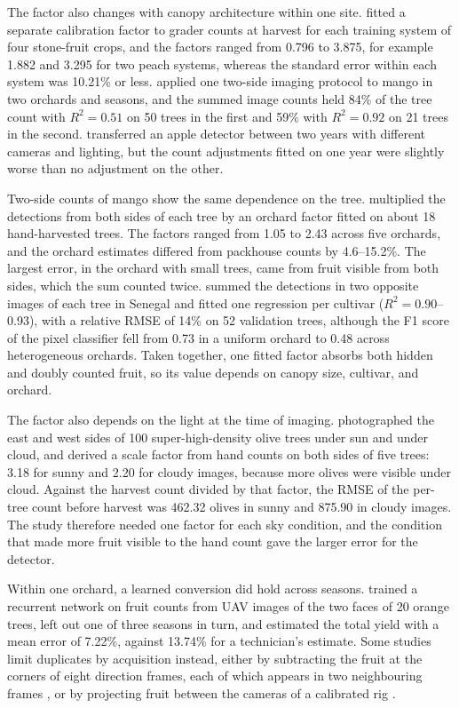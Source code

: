 The factor also changes with canopy architecture within one site. \citet{islam2022ground} fitted a separate calibration factor to grader counts at harvest for each training system of four stone-fruit crops, and the factors ranged from 0.796 to 3.875, for example 1.882 and 3.295 for two peach systems, whereas the standard error within each system was 10.21\% or less. \citet{payne2014estimating} applied one two-side imaging protocol to mango in two orchards and seasons, and the summed image counts held 84\% of the tree count with $R^2=0.51$ on 50 trees in the first and 59\% with $R^2=0.92$ on 21 trees in the second. \citet{linker2018machine} transferred an apple detector between two years with different cameras and lighting, but the count adjustments fitted on one year were slightly worse than no adjustment on the other.

Two-side counts of mango show the same dependence on the tree. \citet{koirala2019deep} multiplied the detections from both sides of each tree by an orchard factor fitted on about 18 hand-harvested trees. The factors ranged from 1.05 to 2.43 across five orchards, and the orchard estimates differed from packhouse counts by 4.6--15.2\%. The largest error, in the orchard with small trees, came from fruit visible from both sides, which the sum counted twice. \citet{sarron2020machine} summed the detections in two opposite images of each tree in Senegal and fitted one regression per cultivar ($R^2=0.90$--0.93), with a relative RMSE of 14\% on 52 validation trees, although the F1 score of the pixel classifier fell from 0.73 in a uniform orchard to 0.48 across heterogeneous orchards. Taken together, one fitted factor absorbs both hidden and doubly counted fruit, so its value depends on canopy size, cultivar, and orchard.

The factor also depends on the light at the time of imaging. \citet{denarda2024shd} photographed the east and west sides of 100 super-high-density olive trees under sun and under cloud, and derived a scale factor from hand counts on both sides of five trees: 3.18 for sunny and 2.20 for cloudy images, because more olives were visible under cloud. Against the harvest count divided by that factor, the RMSE of the per-tree count before harvest was 462.32 olives in sunny and 875.90 in cloudy images. The study therefore needed one factor for each sky condition, and the condition that made more fruit visible to the hand count gave the larger error for the detector.

Within one orchard, a learned conversion did hold across seasons. \citet{apoloapolo2020deep} trained a recurrent network on fruit counts from UAV images of the two faces of 20 orange trees, left out one of three seasons in turn, and estimated the total yield with a mean error of 7.22\%, against 13.74\% for a technician's estimate. Some studies limit duplicates by acquisition instead, either by subtracting the fruit at the corners of eight direction frames, each of which appears in two neighbouring frames \citep{nenavath2024tree}, or by projecting fruit between the cameras of a calibrated rig \citep{villacres2024assessing}.

